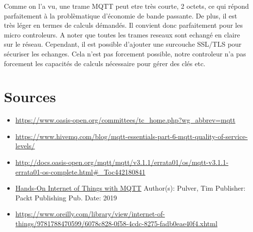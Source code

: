 \documentclass[a4paper,10pt]{article}
\begin{document}
Comme on l'a vu, une trame MQTT peut etre très courte, 2 octets, ce qui répond parfaitement à la problèmatique d'économie de bande passante. De plus, il est très léger en termes de calculs démandés. Il convient donc parfaitement pour les micro controleurs. A noter que toutes les trames reseaux sont echangé en claire sur le réseau. Cependant, il est possible d'ajouter une surcouche SSL/TLS pour sécuriser les echanges. Cela n'est pas forcement possible, notre controleur n'a pas forcement les capacités de calculs nécessaire pour gérer des clés etc.


 \section{Sources}

\begin{itemize}
 \item \url{https://www.oasis-open.org/committees/tc_home.php?wg_abbrev=mqtt}
 \item \url{https://www.hivemq.com/blog/mqtt-essentials-part-6-mqtt-quality-of-service-levels/}
 \item \url{http://docs.oasis-open.org/mqtt/mqtt/v3.1.1/errata01/os/mqtt-v3.1.1-errata01-os-complete.html#_Toc442180841}
 \item \underline{Hands-On Internet of Things with MQTT} Author(s): Pulver, Tim Publisher: Packt Publishing Pub. Date: 2019
 \item \url{https://www.oreilly.com/library/view/internet-of-things/9781788470599/6078c828-0f58-4cdc-8275-fadb0eae40f4.xhtml}
\end{itemize}
\end{document}
